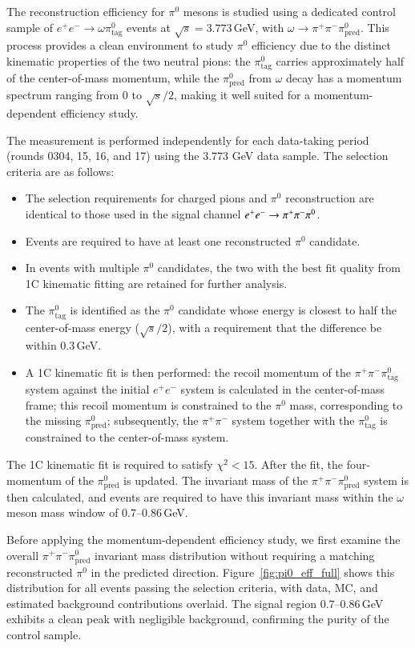 The reconstruction efficiency for $\pi^0$ mesons is studied using a dedicated control sample of $e^+e^- \to \omega \pi^0_{\text{tag}}$ events at $\sqrt{s} = 3.773$\,GeV, with $\omega \to \pi^+\pi^-\pi^0_{\text{pred}}$. This process provides a clean environment to study $\pi^0$ efficiency due to the distinct kinematic properties of the two neutral pions: the $\pi^0_{\text{tag}}$ carries approximately half of the center-of-mass momentum, while the $\pi^0_{\text{pred}}$ from $\omega$ decay has a momentum spectrum ranging from 0 to $\sqrt{s}/2$, making it well suited for a momentum-dependent efficiency study.

The measurement is performed independently for each data-taking period (rounds 0304, 15, 16, and 17) using the $3.773$ GeV data sample. The selection criteria are as follows:
\begin{itemize}
    \item The selection requirements for charged pions and $\pi^0$ reconstruction are identical to those used in the signal channel $e^+e^- \rightarrow \pi^+\pi^-\pi^{0}$.
    \item Events are required to have at least one reconstructed $\pi^0$ candidate.
    \item In events with multiple $\pi^0$ candidates, the two with the best fit quality from 1C kinematic fitting are retained for further analysis.
    \item The $\pi^0_{\text{tag}}$ is identified as the $\pi^0$ candidate whose energy is closest to half the center-of-mass energy ($\sqrt{s}/2$), with a requirement that the difference be within 0.3\,GeV.
    \item A 1C kinematic fit is then performed: the recoil momentum of the $\pi^+\pi^-\pi^0_{\text{tag}}$ system against the initial $e^+e^-$ system is calculated in the center-of-mass frame; this recoil momentum is constrained to the $\pi^0$ mass, corresponding to the missing $\pi^0_{\text{pred}}$; subsequently, the $\pi^+\pi^-$ system together with the $\pi^0_{\text{tag}}$ is constrained to the center-of-mass system.
\end{itemize}
The 1C kinematic fit is required to satisfy $\chi^2 < 15$. After the fit, the four-momentum of the $\pi^0_{\text{pred}}$ is updated. The invariant mass of the $\pi^+\pi^-\pi^0_{\text{pred}}$ system is then calculated, and events are required to have this invariant mass within the $\omega$ meson mass window of $0.7$--$0.86$\,GeV.

Before applying the momentum-dependent efficiency study, we first examine the overall $\pi^+\pi^-\pi^0_{\text{pred}}$ invariant mass distribution without requiring a matching reconstructed $\pi^0$ in the predicted direction. Figure~\ref{fig:pi0_eff_full} shows this distribution for all events passing the selection criteria, with data, MC, and estimated background contributions overlaid. The signal region $0.7$--$0.86$\,GeV exhibits a clean peak with negligible background, confirming the purity of the control sample.

